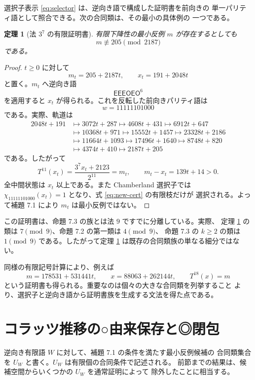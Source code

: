\documentclass[a4paper,11pt]{ltjsarticle}
\theoremstyle{definition}
\theoremstyle{plain}
\newtheorem{theorem}[definition]{定理}
\newcommand{\Odd}{\mathsf{O}}
\newcommand{\Even}{\mathsf{E}}
\newcommand{\1}{\mathbf{1}}
\begin{document}
選択子表示 \eqref{eq:selector} は、逆向き語で構成した証明書を前向きの
単一パリティ語として照合できる。次の合同類は、その最小の具体例の
一つである。

\begin{theorem}[法 $3^7$ の有限証明書]\label{thm:205}
有限下降性の最小反例 $m$ が存在するとしても
\[
 m\not\equiv205\pmod{2187}
\]
である。
\end{theorem}

\begin{proof}
$t\ge0$ に対して
\[
 m_t=205+2187t,\qquad x_t=191+2048t
\]
と置く。$m_t$ へ逆向き語
\[
 \Even\Even\Even\Odd\Even\Odd^6
\]
を適用すると $x_t$ が得られる。これを反転した前向きパリティ語は
\[
 w=11111101000
\]
である。実際、軌道は
\begin{align*}
2048t+191&\longmapsto3072t+287
\longmapsto4608t+431
\longmapsto6912t+647\\
&\longmapsto10368t+971
\longmapsto15552t+1457
\longmapsto23328t+2186\\
&\longmapsto11664t+1093
\longmapsto17496t+1640
\longmapsto8748t+820\\
&\longmapsto4374t+410
\longmapsto2187t+205
\end{align*}
である。したがって
\begin{equation}\label{eq:new-cert}
 T^{11}(x_t)=\frac{3^7x_t+2123}{2^{11}}=m_t,\qquad
 m_t-x_t=139t+14>0.
\end{equation}
全中間状態は $x_t$ 以上である。また Chamberland 選択子では
$\chi_{11111101000}(x_t)=1$ となり、式 \eqref{eq:new-cert} の有限枝だけが
選択される。よって補題 7.1 により $m_t$ は最小反例ではない。
\end{proof}

この証明書は、命題 7.3 の族とは法 $9$ ですでに分離している。実際、
定理 \ref{thm:205} の類は $7\pmod9$、命題 7.2 の第一類は $4\pmod9$、
命題 7.3 の $k\ge2$ の類は $1\pmod9$ である。したがって定理
\ref{thm:205} は既存の合同類族の単なる細分ではない。

同様の有限記号計算により、例えば
\[
 m=178531+531441t,\qquad x=88063+262144t,\qquad
 T^{18}(x)=m
\]
という証明書も得られる。重要なのは個々の大きな合同類を列挙すること
より、選択子と逆向き語から証明書族を生成する文法を得た点である。

\section{コラッツ推移の○由来保存と◎閉包}

逆向き有限語 $W$ に対して、補題 7.1 の条件を満たす最小反例候補の
合同類集合を $U_W$ と書く。$U_W$ は有限個の合同条件で記述される。
前節までの結果は、候補空間からいくつかの $U_W$ を通常証明によって
除外したことに相当する。
\end{document}
